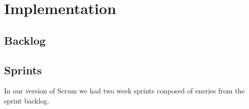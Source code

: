 \section{Implementation}
\thispagestyle{plain}


\subsection{Backlog}


\subsection{Sprints}

In our version of Scrum we had two week sprints conposed of eneries from the sprint backlog. 






